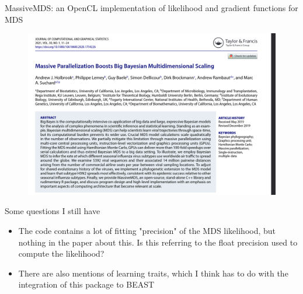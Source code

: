 \documentclass{beamer}
\begin{document}
\begin{frame}{MassiveMDS: an OpenCL implementation of likelihood and gradient functions for MDS}
    \begin{figure}
        \includegraphics[width=1.0\textwidth]{2022-10-03-21-17-16.png}
    \end{figure}   
\end{frame}

\begin{frame}{Some questions I still have}
    \begin{itemize}
        \item The code contains a lot of fitting "precision" of the MDS likelihood, but nothing in the paper about this. Is this referring to the float precision used to compute the likelihood?
        \item There are also mentions of learning traits, which I think has to do with the integration of this package to BEAST
    \end{itemize}
\end{frame}

\begin{frame}[allowframebreaks]



\end{frame}
\end{document}
